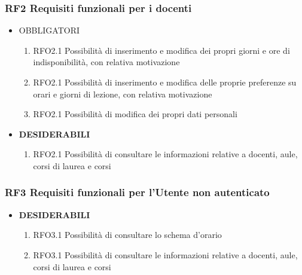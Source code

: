 \documentclass[11pt,a4paper]{article}
\begin{document}
\subsubsection{RF2 Requisiti funzionali per i docenti}
\begin{itemize}
\item \textsc{OBBLIGATORI}
\begin{enumerate}
\item RFO2.1 Possibilità di inserimento e modifica dei propri giorni e ore di indisponibilità, con relativa motivazione
\item RFO2.1 Possibilità di inserimento e modifica delle proprie preferenze su orari e giorni di lezione, con relativa motivazione
\item RFO2.1 Possibilità di modifica dei propri dati personali
\end{enumerate}
\item \textbf{DESIDERABILI}
\begin{enumerate}
\item RFO2.1 Possibilità di consultare le informazioni relative a docenti, aule, corsi di laurea e corsi
\end{enumerate}
\end{itemize}
\subsubsection{RF3 Requisiti funzionali per l'Utente non autenticato}
\begin{itemize}
\item \textbf{DESIDERABILI}
\begin{enumerate}
\item RFO3.1 Possibilità di consultare lo schema d'orario
\item RFO3.1 Possibilità di consultare le informazioni relative a docenti, aule, corsi di laurea e corsi
\end{enumerate}
\end{itemize}
\end{document}
